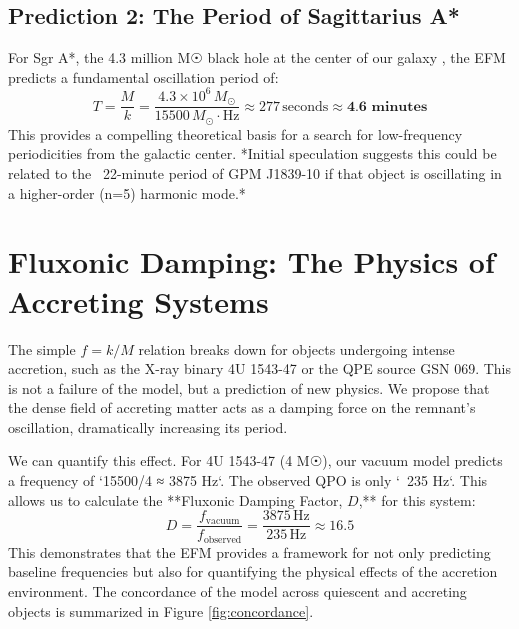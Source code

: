 \documentclass[11pt, twoside]{article}
\begin{document}
\subsection{Prediction 2: The Period of Sagittarius A*}
For Sgr A*, the 4.3 million M☉ black hole at the center of our galaxy \citep{SgrA_mass}, the EFM predicts a fundamental oscillation period of:
\[ T = \frac{M}{k} = \frac{4.3 \times 10^6 \, M_\odot}{15500 \, M_\odot \cdot \text{Hz}} \approx 277 \, \text{seconds} \approx \textbf{4.6 minutes} \]
This provides a compelling theoretical basis for a search for low-frequency periodicities from the galactic center. *Initial speculation suggests this could be related to the ~22-minute period of GPM J1839-10 if that object is oscillating in a higher-order (n=5) harmonic mode.*

\section{Fluxonic Damping: The Physics of Accreting Systems}
The simple \(f=k/M\) relation breaks down for objects undergoing intense accretion, such as the X-ray binary 4U 1543-47 or the QPE source GSN 069. This is not a failure of the model, but a prediction of new physics. We propose that the dense field of accreting matter acts as a damping force on the remnant's oscillation, dramatically increasing its period.

We can quantify this effect. For 4U 1543-47 (4 M☉), our vacuum model predicts a frequency of `15500/4 ≈ 3875 Hz`. The observed QPO is only `~235 Hz`. This allows us to calculate the **Fluxonic Damping Factor, \(D\),** for this system:
\[ D = \frac{f_{\text{vacuum}}}{f_{\text{observed}}} = \frac{3875 \, \text{Hz}}{235 \, \text{Hz}} \approx 16.5 \]
This demonstrates that the EFM provides a framework for not only predicting baseline frequencies but also for quantifying the physical effects of the accretion environment. The concordance of the model across quiescent and accreting objects is summarized in Figure \ref{fig:concordance}.
\end{document}
